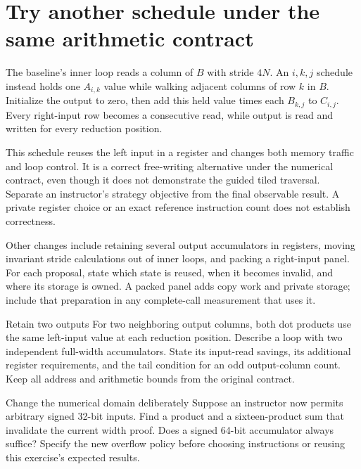\section{Try another schedule under the same arithmetic contract}
The baseline's inner loop reads a column of \(B\) with stride \(4N\). An
\(i,k,j\) schedule instead holds one \(A_{i,k}\) value while walking adjacent
columns of row \(k\) in \(B\). Initialize the output to zero, then add this
held value times each \(B_{k,j}\) to \(C_{i,j}\). Every right-input row becomes
a consecutive read, while output is read and written for every reduction position.

This schedule reuses the left input in a register and changes both memory traffic
and loop control. It is a correct free-writing alternative under the numerical
contract, even though it does not demonstrate the guided tiled traversal. Separate
an instructor's strategy objective from the final observable result. A private
register choice or an exact reference instruction count does not establish correctness.

Other changes include retaining several output accumulators in registers, moving
invariant stride calculations out of inner loops, and packing a right-input panel.
For each proposal, state which state is reused, when it becomes invalid, and where
its storage is owned. A packed panel adds copy work and private storage; include
that preparation in any complete-call measurement that uses it.

\begin{MARSExercise}{Retain two outputs}
  For two neighboring output columns, both dot products use the same left-input value
  at each reduction position. Describe a loop with two independent full-width
  accumulators. State its input-read savings, its additional register requirements,
  and the tail condition for an odd output-column count. Keep all address and arithmetic
  bounds from the original contract.
\end{MARSExercise}

\begin{MARSExercise}{Change the numerical domain deliberately}
  Suppose an instructor now permits arbitrary signed 32-bit inputs. Find a product
  and a sixteen-product sum that invalidate the current width proof. Does a signed
  64-bit accumulator always suffice? Specify the new overflow policy before choosing
  instructions or reusing this exercise's expected results.
\end{MARSExercise}

